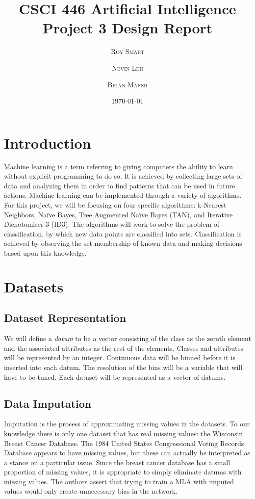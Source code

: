 \documentclass{article}
\title{\vspace{-15mm}\fontsize{24pt}{10pt}\selectfont\textbf{CSCI 446 Artificial Intelligence \\[2mm] Project 3 Design Report} } %
\date{\today}
\author{
\large
\textsc{Roy Smart} \and \textsc{Nevin Leh} \and \textsc{Brian Marsh}\\[2mm] %
}
\begin{document}
	\maketitle %
	\thispagestyle{fancy} %
	\normalsize

	\section{Introduction}
		Machine learning is a term referring to giving computers the ability to learn without explicit programming to do so.  It is achieved by collecting large sets of data and analyzing them in order to find patterns that can be used in future actions.  Machine learning can be implemented through a variety of algorithms.  For this project, we will be focusing on four specific algorithms: k-Nearest Neighbors, Naïve Bayes, Tree Augmented Naïve Bayes (TAN), and Iterative Dichotomiser 3 (ID3).  The algorithms will work to solve the problem of classification, by which new data points are classified into sets.  Classification is achieved by observing the set membership of known data and making decisions based upon this knowledge.
	\section{Datasets}
		\subsection{Dataset Representation}
			We will define a \textit{datum} to be a vector consisting of the class as the zeroth element and the associated attributes as the rest of the elements. Classes and attributes will be represented by an integer. Continuous data will be binned before it is inserted into each datum. The resolution of the bins will be a variable that will have to be tuned. Each dataset will be represented as a vector of datums.
		\subsection{Data Imputation}
			Imputation is the process of approximating missing values in the datasets. 
			To our knowledge there is only one dataset that has real missing values: the Wisconsin Breast Cancer Database. 
			The 1984 United States Congressional Voting Records Database appears to have missing values, but these can actually be interpreted as a stance on a particular issue. 
			Since the breast cancer database has a small proportion of missing values, it is appropriate to simply eliminate datums with missing values. 
			The authors assert that trying to train a MLA with imputed values would only create unnecessary bias in the network.
			
\end{document}
